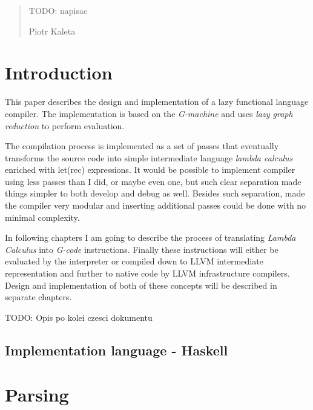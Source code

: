 \documentclass[12pt,a4paper]{report}
\begin{document}
\renewcommand{\abstractname}{Acknowledgements}
\begin{abstract}
  \normalsize
  \center

  TODO: napisac

  \begin{flushright}
    Piotr Kaleta
  \end{flushright}
\end{abstract}

\normalsize

\tableofcontents

\onehalfspace

\chapter{Introduction}

This paper describes the design and implementation of a lazy functional
language compiler. The implementation is based on the
\textit{G-machine}\cite{Jon87} and uses \textit{lazy graph reduction} to
perform evaluation.

The compilation process is implemented as a set of passes that eventually
transforms the source code into simple intermediate language \textit{lambda
calculus} enriched with let(rec) expressions. It would be possible to implement
compiler using less passes than I did, or maybe even one, but such clear
separation made things simpler to both develop and debug as well. Besides such
separation, made the compiler very modular and inserting additional passes
could be done with no minimal complexity.


In following chapters I am going to describe the process of translating
\textit{Lambda Calculus} into \textit{G-code} instructions.  Finally these
instructions will either be evaluated by the interpreter or compiled down to
LLVM intermediate representation and further to native code by LLVM
infrastructure compilers. Design and implementation of both of these concepts
will be described in separate chapters.

TODO: Opis po kolei czesci dokumentu

\section{Implementation language - Haskell}


\chapter{Parsing}
\end{document}
